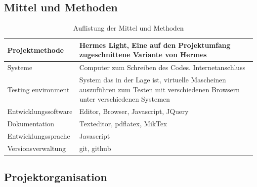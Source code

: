 \documentclass[11pt,paper=a4,final]{scrartcl}
\begin{document}
\subsection{Mittel und Methoden}
\begin{table}[h!]
 \centering
  \begin{tabular}{|l|p{10cm}|}
  \hline
  Projektmethode & Hermes Light, Eine auf den Projektumfang zugeschnittene Variante von Hermes \\ \hline
  Systeme & Computer zum Schreiben des Codes. Internetanschluss \\ \hline
  Testing environment & System das in der Lage ist, virtuelle Mascheinen auszuf\"uhren zum Testen mit verschiedenen Browsern unter verschiedenen Systemen \\ \hline
  Entwicklungssoftware & Editor, Browser, Javascript, JQuery \\ \hline
  Dokumentation & Texteditor, pdflatex, MikTex \\ \hline
  Entwicklungssprache & Javascript \\ \hline
  Versionsverwaltung & git, github \\ \hline
  \end{tabular}
  \caption{Auflistung der Mittel und Methoden}
\end{table}
\subsection{Projektorganisation}
\end{document}
